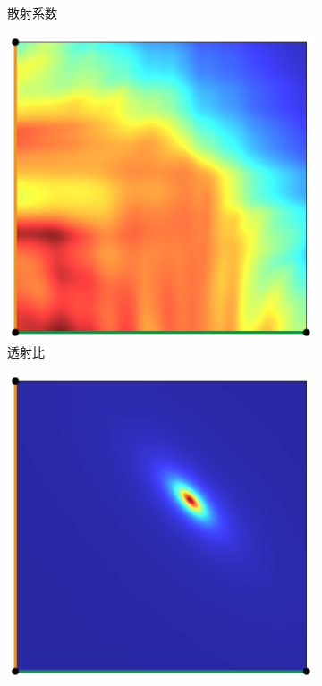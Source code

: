 \begin{figure}
\begin{fullwidth}
\begin{subfigure}[b]{0.19\thewidth}
		\caption{散射系数}
	\end{subfigure}
	\begin{subfigure}[b]{0.19\thewidth}
		\includegraphics[width=1.0\textwidth]{figures/ir/vrl-transmittance}
		\caption{透射比}
	\end{subfigure}
	\begin{subfigure}[b]{0.19\thewidth}
		\includegraphics[width=1.0\textwidth]{figures/ir/vrl-inverse}

\end{subfigure}
\end{fullwidth}
\end{figure}
